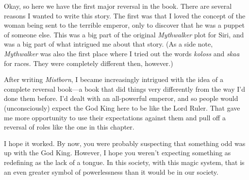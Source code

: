Okay, so here we have the first major reversal in the book. There are several reasons I wanted to write this story. The first was that I loved the concept of the woman being sent to the terrible emperor, only to discover that he was a puppet of someone else. This was a big part of the original \textit{Mythwalker} plot for Siri, and was a big part of what intrigued me about that story. (As a side note, \textit{Mythwalker} was also the first place where I tried out the words \textit{koloss} and \textit{skaa} for races. They were completely different then, however.)

After writing \textit{Mistborn}, I became increasingly intrigued with the idea of a complete reversal book—a book that did things very differently from the way I’d done them before. I’d dealt with an all-powerful emperor, and so people would (unconsciously) expect the God King here to be like the Lord Ruler. That gave me more opportunity to use their expectations against them and pull off a reversal of roles like the one in this chapter.

I hope it worked. By now, you were probably suspecting that something odd was up with the God King. However, I hope you weren’t expecting something as redefining as the lack of a tongue. In this society, with this magic system, that is an even greater symbol of powerlessness than it would be in our society.



